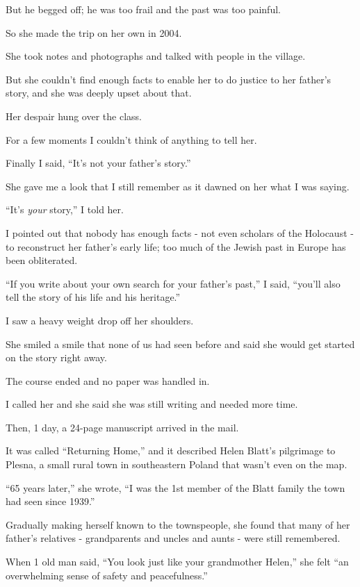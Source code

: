 \documentclass{book}
\numberwithin{equation}{section}
\begin{document}
But he begged off; he was too frail and the past was too painful.

%
So she made the trip on her own in 2004.

She took notes and photographs and talked with people in the village.

But she couldn't find enough facts to enable her to do justice to her father's story, and she was deeply upset about that.

Her despair hung over the class.

%
For a few moments I couldn't think of anything to tell her.

Finally I said, ``It's not your father's story.''

%
She gave me a look that I still remember as it dawned on her what I was saying.

%
``It's \textit{your} story,'' I told her.

I pointed out that nobody has enough facts - not even scholars of the Holocaust - to reconstruct her father's early life; too much of the Jewish past in Europe has been obliterated.

``If you write about your own search for your father's past,'' I said, ``you'll also tell the story of his life and his heritage.''

%
I saw a heavy weight drop off her shoulders.

She smiled a smile that none of us had seen before and said she would get started on the story right away.

%
The course ended and no paper was handled in.

I called her and she said she was still writing and needed more time.

Then, 1 day, a 24-page manuscript arrived in the mail.

It was called ``Returning Home,'' and it described Helen Blatt's pilgrimage to Plesna, a small rural town in southeastern Poland that wasn't even on the map.

``65 years later,'' she wrote, ``I was the 1st member of the Blatt family the town had seen since 1939.''

Gradually making herself known to the townspeople, she found that many of her father's relatives - grandparents and uncles and aunts - were still remembered.

When 1 old man said, ``You look just like your grandmother Helen,'' she felt ``an overwhelming sense of safety and peacefulness.''
\end{document}
